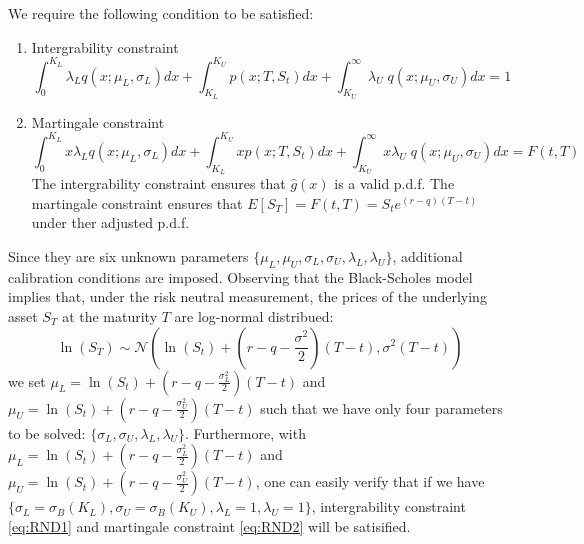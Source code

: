 \documentclass[letterpaper,12pt,titlepage,oneside,final]{book}
\numberwithin{equation}{section}
\theoremstyle{definition}
\begin{document}
We require the following condition to be satisfied:
\begin{enumerate}
	\item Intergrability constraint
	\begin{equation}
	\int_{0}^{K_{L}}	\lambda_{L}   q(x;\mu_{L},\sigma_{L}) dx+
	\int_{K_{L}}^{K_{U}}	  p(x;T,S_t)  dx+
	\int_{K_{U}}^{\infty}	 \lambda_{U} \;  q(x;\mu_{U},\sigma_{U}) dx=1 
	\label{eq:RND1}
	\end{equation}
	\item Martingale  constraint
	\begin{equation}
	\int_{0}^{K_{L}}	 x \lambda_{L}   q(x;\mu_{L},\sigma_{L}) dx+
	\int_{K_{L}}^{K_{U}}	  x p(x;T,S_t)  dx+
	\int_{K_{U}}^{\infty}	 x \lambda_{U} \;  q(x;\mu_{U},\sigma_{U}) dx=F(t,T)
	\label{eq:RND2}
	\end{equation}
	The intergrability constraint ensures that $\hat{g}(x)$ is a valid p.d.f. The martingale  constraint ensures that $E[S_T]=F(t,T)=S_{t}e^{(r-q)(T-t)}$ under ther adjusted p.d.f.
	
	
\end{enumerate}
Since they are six  unknown parameters $\{\mu_{L}, \mu_{U},\sigma_{L},\sigma_{U}, \lambda_{L}, \lambda_{U}\}$, additional calibration conditions are imposed. Observing that the Black-Scholes \cite{black1973pricing} model implies that, under the risk neutral measurement, the prices of the underlying asset $S_T$ at the maturity $T$ are log-normal distribued:
\[
\ln(S_T) \sim  \mathcal{N}(\ln(S_t)+(r-q-\frac{\sigma^2}{2})(T-t),\sigma^2 (T-t))
\]
we set $\mu_L=\ln(S_t)+(r-q-\frac{\sigma_L^2}{2})(T-t)$ and $\mu_U=\ln(S_t)+(r-q-\frac{\sigma_U^2}{2})(T-t)$ such that we have only four parameters to be solved: $\{\sigma_{L},\sigma_{U}, \lambda_{L}, \lambda_{U}\}$. Furthermore, with $\mu_L=\ln(S_t)+(r-q-\frac{\sigma_L^2}{2})(T-t)$ and $\mu_U=\ln(S_t)+(r-q-\frac{\sigma_U^2}{2})(T-t)$, one can easily verify that if we have $\{\sigma_{L}=\sigma_{B}(K_L),\sigma_{U}=\sigma_{B}(K_U), \lambda_{L}=1, \lambda_{U}=1\}$, intergrability constraint \eqref{eq:RND1} and martingale  constraint \eqref{eq:RND2} will be  satisified.  
\end{document}
